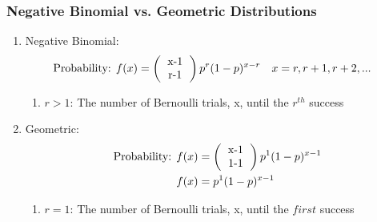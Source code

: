 \documentclass[../INDE315.tex]{subfiles}
\begin{document}
\subsubsection*{Negative Binomial vs. Geometric Distributions}
\begin{enumerate}
    \item Negative Binomial:
        \begin{equation*}
            \begin{aligned}
                \text{Probability: } & f(x) = \left( \begin{tabular}{c}
                    x-1 \\
                    r-1
                    \end{tabular}  \right) p^r (1-p)^{x-r} \quad x = r,r + 1, r + 2,... 
            \end{aligned}
        \end{equation*}
        \begin{enumerate}
            \item $r > 1$: The number of Bernoulli trials, x, until the $r^{th}$ success
        \end{enumerate}
    \item Geometric:
        \begin{equation*}
            \begin{aligned}
                \text{Probability: } & f(x) = \left( \begin{tabular}{c}
                    x-1 \\
                    1-1
                    \end{tabular}  \right) p^1 (1-p)^{x-1} \\
                    & f(x) = p^1 (1-p)^{x-1} 
            \end{aligned}
        \end{equation*}
        \begin{enumerate}
            \item $r = 1$: The number of Bernoulli trials, x, until the $first$ success
        \end{enumerate}
\end{enumerate}
\end{document}
